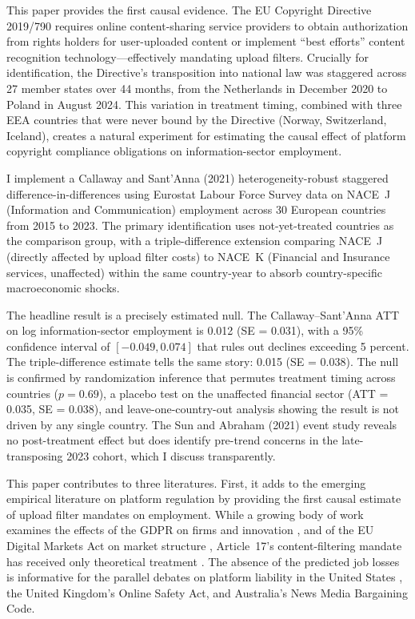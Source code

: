 \documentclass[12pt]{article}
\begin{document}
This paper provides the first causal evidence. The EU Copyright Directive 2019/790 requires online content-sharing service providers to obtain authorization from rights holders for user-uploaded content or implement ``best efforts'' content recognition technology---effectively mandating upload filters. Crucially for identification, the Directive's transposition into national law was staggered across 27 member states over 44 months, from the Netherlands in December 2020 to Poland in August 2024. This variation in treatment timing, combined with three EEA countries that were never bound by the Directive (Norway, Switzerland, Iceland), creates a natural experiment for estimating the causal effect of platform copyright compliance obligations on information-sector employment.

I implement a Callaway and Sant'Anna (2021) heterogeneity-robust staggered difference-in-differences using Eurostat Labour Force Survey data on NACE~J (Information and Communication) employment across 30 European countries from 2015 to 2023. The primary identification uses not-yet-treated countries as the comparison group, with a triple-difference extension comparing NACE~J (directly affected by upload filter costs) to NACE~K (Financial and Insurance services, unaffected) within the same country-year to absorb country-specific macroeconomic shocks.

The headline result is a precisely estimated null. The Callaway--Sant'Anna ATT on log information-sector employment is 0.012 (SE = 0.031), with a 95\% confidence interval of $[-0.049, 0.074]$ that rules out declines exceeding 5 percent. The triple-difference estimate tells the same story: 0.015 (SE = 0.038). The null is confirmed by randomization inference that permutes treatment timing across countries ($p = 0.69$), a placebo test on the unaffected financial sector (ATT = 0.035, SE = 0.038), and leave-one-country-out analysis showing the result is not driven by any single country. The Sun and Abraham (2021) event study reveals no post-treatment effect but does identify pre-trend concerns in the late-transposing 2023 cohort, which I discuss transparently.

This paper contributes to three literatures. First, it adds to the emerging empirical literature on platform regulation by providing the first causal estimate of upload filter mandates on employment. While a growing body of work examines the effects of the GDPR on firms and innovation \citep{goldberg2023gdpr, janssen2022gdpr}, and of the EU Digital Markets Act on market structure \citep{cabral2021eu}, Article~17's content-filtering mandate has received only theoretical treatment \citep{peukert2022copyright}. The absence of the predicted job losses is informative for the parallel debates on platform liability in the United States \citep{kosseff2019twenty}, the United Kingdom's Online Safety Act, and Australia's News Media Bargaining Code.
\end{document}
